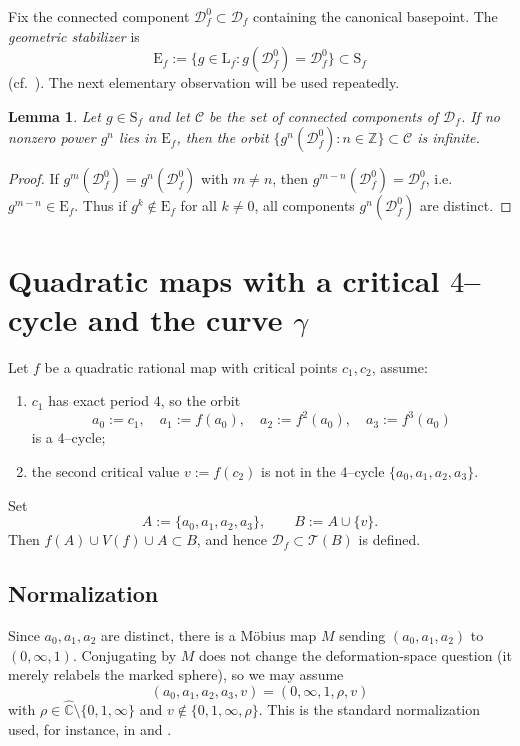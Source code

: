 \documentclass[11pt]{article}
\newtheorem{lemma}[theorem]{Lemma}
\theoremstyle{definition}
\newcommand{\Teich}{\mathcal{T}}
\newcommand{\Def}{\mathcal{D}}
\begin{document}
Fix the connected component $\Def_f^0\subset \Def_f$ containing the canonical basepoint. The \emph{geometric stabilizer} is
\[
\mathrm{E}_f:=\{g\in \mathrm{L}_f: g(\Def_f^0)=\Def_f^0\}\subset \mathrm{S}_f
\]
(cf.\ \cite[\S 3.4]{HK}). The next elementary observation will be used repeatedly.

\begin{lemma}
\label{lem:infiniteorbitcriterion}
Let $g\in \mathrm{S}_f$ and let $\mathcal{C}$ be the set of connected components of $\Def_f$. If no nonzero power $g^n$ lies in $\mathrm{E}_f$, then the orbit $\{g^n(\Def_f^0):n\in\mathbb{Z}\}\subset \mathcal{C}$ is infinite.
\end{lemma}

\begin{proof}
If $g^m(\Def_f^0)=g^n(\Def_f^0)$ with $m\neq n$, then $g^{m-n}(\Def_f^0)=\Def_f^0$, i.e.\ $g^{m-n}\in \mathrm{E}_f$. Thus if $g^k\notin \mathrm{E}_f$ for all $k\neq 0$, all components $g^n(\Def_f^0)$ are distinct.
\end{proof}

\section{Quadratic maps with a critical $4$--cycle and the curve \texorpdfstring{$\gamma$}{gamma}}

Let $f$ be a quadratic rational map with critical points $c_1,c_2$, assume:
\begin{enumerate}
\item $c_1$ has exact period $4$, so the orbit
\[
a_0:=c_1,\quad a_1:=f(a_0),\quad a_2:=f^2(a_0),\quad a_3:=f^3(a_0)
\]
is a $4$--cycle;
\item the second critical value $v:=f(c_2)$ is not in the $4$--cycle $\{a_0,a_1,a_2,a_3\}$.
\end{enumerate}
Set
\[
A:=\{a_0,a_1,a_2,a_3\},\qquad B:=A\cup\{v\}.
\]
Then $f(A)\cup V(f)\cup A\subset B$, and hence $\Def_f\subset \Teich(B)$ is defined.

\subsection*{Normalization}
Since $a_0,a_1,a_2$ are distinct, there is a M\"obius map $M$ sending $(a_0,a_1,a_2)$ to $(0,\infty,1)$. Conjugating by $M$ does not change the deformation-space question (it merely relabels the marked sphere), so we may assume
\begin{equation}
\label{eq:normalize}
(a_0,a_1,a_2,a_3,v)=(0,\infty,1,\rho,v)
\end{equation}
with $\rho\in \widehat{\mathbb{C}}\setminus\{0,1,\infty\}$ and $v\notin\{0,1,\infty,\rho\}$. This is the standard normalization used, for instance, in \cite[\S 6]{FKS} and \cite[\S 5]{HK}.
\end{document}
